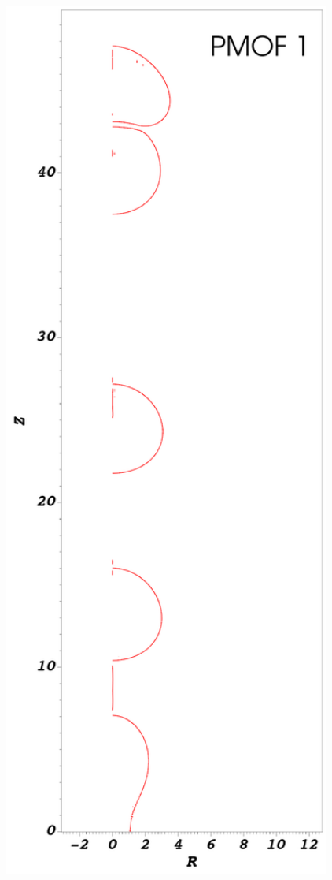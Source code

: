 \documentclass[preprint,12pt]{Definitions/elsarticle}
\begin{document}
\begin{figure}[H]
\begin{minipage}[b]{.32\linewidth}
	\end{minipage}
	\begin{minipage}[b]{.32\linewidth}
		\centering
		\includegraphics[width=1\textwidth]{PMOFbubbleformation/PMOF_1_bubbleformation.png} 

\end{minipage}
\end{figure}
\end{document}
